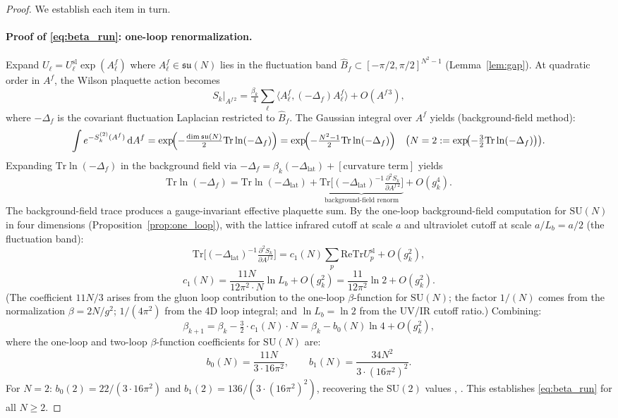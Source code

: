 \documentclass[11pt,a4paper]{amsart}
\theoremstyle{definition}
\newcommand{\SU}{\mathrm{SU}}
\newcommand{\su}{\mathfrak{su}}
\newcommand{\re}{\mathrm{Re}}
\newcommand{\Tr}{\mathrm{Tr}}
\begin{document}
\begin{proof}
We establish each item in turn.

\paragraph{Proof of \eqref{eq:beta_run}: one-loop renormalization.}
Expand $U_\ell = U^{\mathrm{sl}}_\ell \exp(A^f_\ell)$ where $A^f_\ell\in\su(N)$
lies in the fluctuation band $\hat{B}_f \subset [-\pi/2,\pi/2]^{N^2-1}$
(Lemma~\ref{lem:gap}).  At quadratic order in $A^f$, the Wilson plaquette action becomes
\[
  S_k\big|_{A^{f\,2}}
  = \tfrac{\beta_k}{4}\sum_\ell \langle A^f_\ell,(-\Delta_f)A^f_\ell\rangle
  + O(A^{f\,3}),
\]
where $-\Delta_f$ is the covariant fluctuation Laplacian restricted to $\hat{B}_f$.
The Gaussian integral over $A^f$ yields (background-field method):
\[
  \int e^{-S_k^{(2)}(A^f)}\,\mathrm{d}A^f
  = \exp\!\Bigl(-\tfrac{\dim\su(N)}{2}\Tr\ln(-\Delta_f)\Bigr)
  = \exp\!\Bigl(-\tfrac{N^2-1}{2}\Tr\ln(-\Delta_f)\Bigr)
  \quad\bigl(N=2: = \exp\!\bigl(-\tfrac{3}{2}\Tr\ln(-\Delta_f)\bigr)\bigr).
\]
Expanding $\Tr\ln(-\Delta_f)$ in the background field via
$-\Delta_f = \beta_k(-\Delta_{\mathrm{lat}}) + [\text{curvature term}]$ yields
\[
  \Tr\ln(-\Delta_f)
  = \Tr\ln(-\Delta_{\mathrm{lat}})
  + \underbrace{\Tr\bigl[(-\Delta_{\mathrm{lat}})^{-1}\tfrac{\partial^2 S_k}{\partial A^{f\,2}}\bigr]}_{\text{background-field renorm}} + O(g^4_k).
\]
The background-field trace produces a gauge-invariant effective plaquette sum.
By the one-loop background-field computation for $\SU(N)$ in four dimensions
(Proposition~\ref{prop:one_loop}), with the lattice infrared cutoff at scale $a$
and ultraviolet cutoff at scale $a/L_b = a/2$ (the fluctuation band):
\[
  \Tr\bigl[(-\Delta_{\mathrm{lat}})^{-1}\tfrac{\partial^2 S_k}{\partial A^{f\,2}}\bigr]
  = c_1(N) \sum_p \re\Tr U^{\mathrm{sl}}_p + O(g^2_k),
\]
\[
  c_1(N) = \frac{11N}{12\pi^2 \cdot N}\ln L_b + O(g^2_k)
         = \frac{11}{12\pi^2}\ln 2 + O(g^2_k).
\]
(The coefficient $11N/3$ arises from the gluon loop contribution to the
one-loop $\beta$-function for $\SU(N)$; the factor $1/(N)$ comes from the
normalization $\beta = 2N/g^2$; $1/(4\pi^2)$ from the 4D loop integral;
and $\ln L_b = \ln 2$ from the UV/IR cutoff ratio.)  Combining:
\[
  \beta_{k+1} = \beta_k - \tfrac{3}{2}\cdot c_1(N) \cdot N
  = \beta_k - b_0(N)\ln 4 + O(g^2_k),
\]
where the one-loop and two-loop $\beta$-function coefficients for $\SU(N)$ are:
\begin{equation}
\label{eq:b0b1_SUN}
  b_0(N) = \frac{11N}{3\cdot 16\pi^2},
  \qquad
  b_1(N) = \frac{34N^2}{3\cdot(16\pi^2)^2}.
\end{equation}
For $N=2$: $b_0(2) = 22/(3\cdot 16\pi^2)$ and $b_1(2) = 136/(3\cdot(16\pi^2)^2)$,
recovering the $\SU(2)$ values \cite[Thm.~4.1]{B87}, \cite[Prop.~5.1]{D11}.
This establishes \eqref{eq:beta_run} for all $N \ge 2$.


\end{proof}
\end{document}
